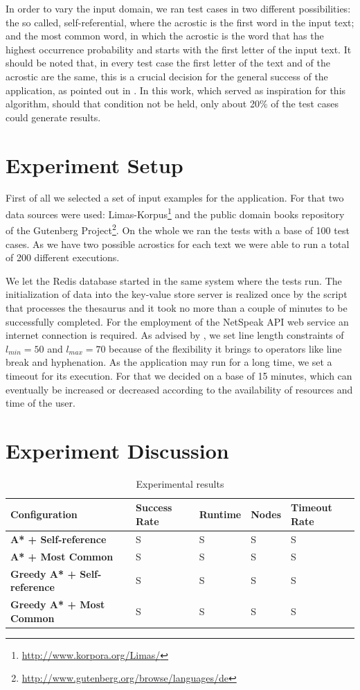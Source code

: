 \documentclass[11pt]{reportAlternative}
\begin{document}
In order to vary the input domain, we ran test cases in two different possibilities: the so called, self-referential, where the acrostic is the first word in the input text; and the most common word, in which the acrostic is the word that has the highest occurrence probability and starts with the first letter of the input text. It should be noted that, in every test case the first letter of the text and of the acrostic are the same, this is a crucial decision for the general success of the application, as pointed out in \cite{Stein}. In this work, which served as inspiration for this algorithm, should that condition not be held, only about 20\% of the test cases could generate results.

\section{Experiment Setup}
First of all we selected a set of input examples for the application. For that two data sources were used: Limas-Korpus\footnote{\url{http://www.korpora.org/Limas/}} and the public domain books repository of the Gutenberg Project\footnote{\url{http://www.gutenberg.org/browse/languages/de}}. On the whole we ran the tests with a base of  100 test cases. As we have two possible acrostics for each text we were able to run a total of 200 different executions.

We let the Redis database started in the same system where the tests run. The initialization of data into the key-value store server is realized once by the script that processes the thesaurus and it took no more than a couple of minutes to be successfully completed. For the employment of the NetSpeak API web service an internet connection is required. As advised by \cite{Stein}, we set line length constraints of $l_{min} = 50$ and $l_{max} = 70$ because of the flexibility it brings to operators like line break and hyphenation. As the application may run for a long time, we set a timeout for its execution. For that we decided on a base of 15 minutes, which can eventually be increased or decreased according to the availability of resources and time of the user.

\section{Experiment Discussion}

\begin{table}
\centering
\begin{tabular}{l | l | l | l | l}
	\hline
	\textbf{Configuration} & \textbf{Success Rate} & \textbf{Runtime} & \textbf{Nodes} & \textbf{Timeout Rate} \\ \hline
		\textbf{A* + Self-reference}	& S	& S	& S	& S \\ \hline
		\textbf{A* + Most Common}		& S	& S	& S	& S \\ \hline
		\textbf{Greedy A* + Self-reference}	& S & S	& S	& S \\ \hline
		\textbf{Greedy A* + Most Common}	& S & S	& S	& S \\
	\hline
\end{tabular}
\label{tab:results}
\caption{Experimental results}
\end{table}
\end{document}
